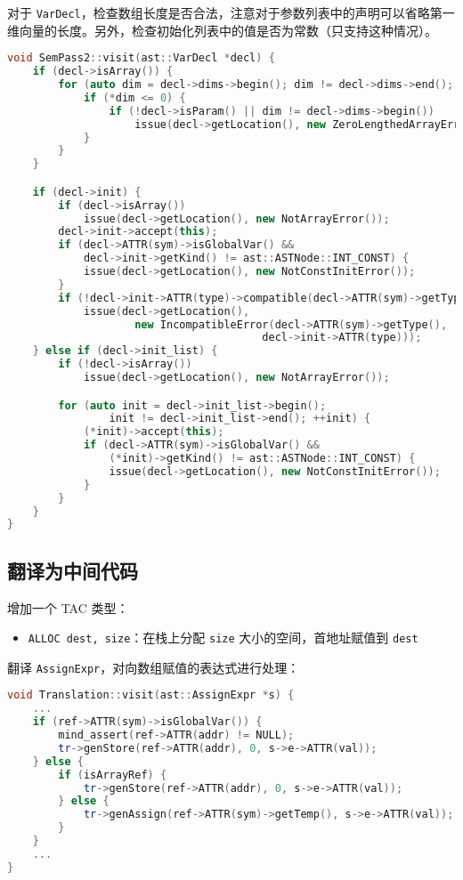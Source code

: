\documentclass[a4paper]{article}
\begin{document}
对于 \texttt{VarDecl}，检查数组长度是否合法，注意对于参数列表中的声明可以省略第一维向量的长度。另外，检查初始化列表中的值是否为常数（只支持这种情况）。

\begin{lstlisting}[language=c++]
void SemPass2::visit(ast::VarDecl *decl) {
    if (decl->isArray()) {
        for (auto dim = decl->dims->begin(); dim != decl->dims->end(); ++dim) {
            if (*dim <= 0) {
                if (!decl->isParam() || dim != decl->dims->begin())
                    issue(decl->getLocation(), new ZeroLengthedArrayError());
            }
        }
    }

    if (decl->init) {
        if (decl->isArray())
            issue(decl->getLocation(), new NotArrayError());
        decl->init->accept(this);
        if (decl->ATTR(sym)->isGlobalVar() &&
            decl->init->getKind() != ast::ASTNode::INT_CONST) {
            issue(decl->getLocation(), new NotConstInitError());
        }
        if (!decl->init->ATTR(type)->compatible(decl->ATTR(sym)->getType()))
            issue(decl->getLocation(),
                    new IncompatibleError(decl->ATTR(sym)->getType(),
                                        decl->init->ATTR(type)));
    } else if (decl->init_list) {
        if (!decl->isArray())
            issue(decl->getLocation(), new NotArrayError());

        for (auto init = decl->init_list->begin();
                init != decl->init_list->end(); ++init) {
            (*init)->accept(this);
            if (decl->ATTR(sym)->isGlobalVar() &&
                (*init)->getKind() != ast::ASTNode::INT_CONST) {
                issue(decl->getLocation(), new NotConstInitError());
            }
        }
    }
}
\end{lstlisting}

\subsection{翻译为中间代码}

增加一个 TAC 类型：

\begin{itemize}
    \item \texttt{ALLOC dest, size}：在栈上分配 \texttt{size} 大小的空间，首地址赋值到 \texttt{dest}
\end{itemize}

翻译 \texttt{AssignExpr}，对向数组赋值的表达式进行处理：

\begin{lstlisting}[language=c++]
void Translation::visit(ast::AssignExpr *s) {
    ...
    if (ref->ATTR(sym)->isGlobalVar()) {
        mind_assert(ref->ATTR(addr) != NULL);
        tr->genStore(ref->ATTR(addr), 0, s->e->ATTR(val));
    } else {
        if (isArrayRef) {
            tr->genStore(ref->ATTR(addr), 0, s->e->ATTR(val));
        } else {
            tr->genAssign(ref->ATTR(sym)->getTemp(), s->e->ATTR(val));
        }
    }
    ...
}
\end{lstlisting}
\end{document}
